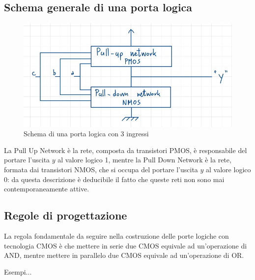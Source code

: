 \documentclass[11pt,a4paper,]{article}
\begin{document}
\subsection{Schema generale di una porta logica}
\begin{figure}[H]
	\centering
	\includegraphics[width=0.5\linewidth]{"img/schema port log"}
	\caption{Schema di una porta logica con 3 ingressi}
	\label{fig:schema-port-log}
\end{figure}
La Pull Up Network è la rete, composta da transistori PMOS, è responsabile del portare l’uscita $y$ al valore logico 1, mentre la Pull Down Network è la rete, formata dai transistori NMOS, che si occupa del portare l’uscita $y$ al valore logico 0: da questa descrizione è deducibile il fatto che queste reti non sono mai contemporaneamente attive.
\subsection{Regole di progettazione}
La regola fondamentale da seguire nella costruzione delle porte logiche con tecnologia CMOS è che mettere in serie due CMOS equivale ad un’operazione di AND, mentre mettere in parallelo due CMOS equivale ad un’operazione di OR.

Esempi...
\end{document}
